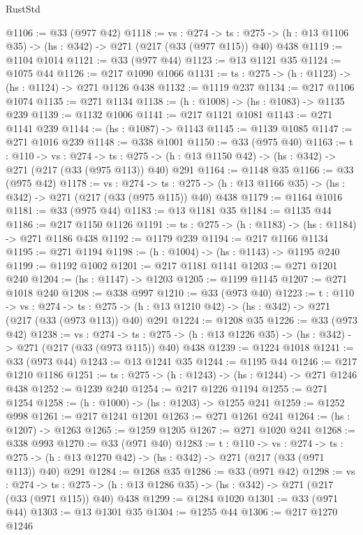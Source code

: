 \begin{lexlean}{RustStd}
\begin{coremodule}
@1106 := @33 (@977 @42)
@1118 := {vs : @274} ->
  {ts : @275} -> (h : @13 @1106 @35) -> (hs : @342) -> @271 (@217 (@33 (@977 @115)) @40) @438
@1119 := @1104 @1014
@1121 := @33 (@977 @44)
@1123 := @13 @1121 @35
@1124 := @1075 @44
@1126 := @217 @1090 @1066
@1131 := {ts : @275} -> (h : @1123) -> (hs : @1124) -> @271 @1126 @438
@1132 := @1119 @237
@1134 := @217 @1106 @1074
@1135 := @271 @1134
@1138 := (h : @1008) -> (hs : @1083) -> @1135 @239
@1139 := @1132 @1006
@1141 := @217 @1121 @1081
@1143 := @271 @1141 @239
@1144 := (hs : @1087) -> @1143
@1145 := @1139 @1085
@1147 := @271 @1016 @239
@1148 := @338 @1001
@1150 := @33 (@975 @40)
@1163 := {t : @110} ->
  {vs : @274} ->
  {ts : @275} -> (h : @13 @1150 @42) -> (hs : @342) -> @271 (@217 (@33 (@975 @113)) @40) @291
@1164 := @1148 @35
@1166 := @33 (@975 @42)
@1178 := {vs : @274} ->
  {ts : @275} -> (h : @13 @1166 @35) -> (hs : @342) -> @271 (@217 (@33 (@975 @115)) @40) @438
@1179 := @1164 @1016
@1181 := @33 (@975 @44)
@1183 := @13 @1181 @35
@1184 := @1135 @44
@1186 := @217 @1150 @1126
@1191 := {ts : @275} -> (h : @1183) -> (hs : @1184) -> @271 @1186 @438
@1192 := @1179 @239
@1194 := @217 @1166 @1134
@1195 := @271 @1194
@1198 := (h : @1004) -> (hs : @1143) -> @1195 @240
@1199 := @1192 @1002
@1201 := @217 @1181 @1141
@1203 := @271 @1201 @240
@1204 := (hs : @1147) -> @1203
@1205 := @1199 @1145
@1207 := @271 @1018 @240
@1208 := @338 @997
@1210 := @33 (@973 @40)
@1223 := {t : @110} ->
  {vs : @274} ->
  {ts : @275} -> (h : @13 @1210 @42) -> (hs : @342) -> @271 (@217 (@33 (@973 @113)) @40) @291
@1224 := @1208 @35
@1226 := @33 (@973 @42)
@1238 := {vs : @274} ->
  {ts : @275} -> (h : @13 @1226 @35) -> (hs : @342) -> @271 (@217 (@33 (@973 @115)) @40) @438
@1239 := @1224 @1018
@1241 := @33 (@973 @44)
@1243 := @13 @1241 @35
@1244 := @1195 @44
@1246 := @217 @1210 @1186
@1251 := {ts : @275} -> (h : @1243) -> (hs : @1244) -> @271 @1246 @438
@1252 := @1239 @240
@1254 := @217 @1226 @1194
@1255 := @271 @1254
@1258 := (h : @1000) -> (hs : @1203) -> @1255 @241
@1259 := @1252 @998
@1261 := @217 @1241 @1201
@1263 := @271 @1261 @241
@1264 := (hs : @1207) -> @1263
@1265 := @1259 @1205
@1267 := @271 @1020 @241
@1268 := @338 @993
@1270 := @33 (@971 @40)
@1283 := {t : @110} ->
  {vs : @274} ->
  {ts : @275} -> (h : @13 @1270 @42) -> (hs : @342) -> @271 (@217 (@33 (@971 @113)) @40) @291
@1284 := @1268 @35
@1286 := @33 (@971 @42)
@1298 := {vs : @274} ->
  {ts : @275} -> (h : @13 @1286 @35) -> (hs : @342) -> @271 (@217 (@33 (@971 @115)) @40) @438
@1299 := @1284 @1020
@1301 := @33 (@971 @44)
@1303 := @13 @1301 @35
@1304 := @1255 @44
@1306 := @217 @1270 @1246

\end{coremodule}
\end{lexlean}

